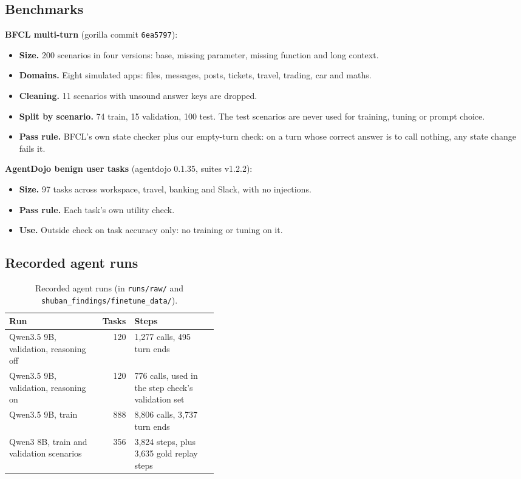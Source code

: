 \documentclass[10.5pt,a4paper]{article}
\newcommand{\tablestyle}{\small\rowcolors{2}{rowshade}{white}}
\newcommand{\code}[1]{\texttt{#1}}
\begin{document}
\subsection{Benchmarks}
\textbf{BFCL multi-turn} (gorilla commit \code{6ea5797}):
\begin{itemize}
  \item \textbf{Size.} 200 scenarios in four versions: base, missing parameter, missing function and long context.
  \item \textbf{Domains.} Eight simulated apps: files, messages, posts, tickets, travel, trading, car and maths.
  \item \textbf{Cleaning.} 11 scenarios with unsound answer keys are dropped.
  \item \textbf{Split by scenario.} 74 train, 15 validation, 100 test. The test scenarios are never used for training, tuning or prompt choice.
  \item \textbf{Pass rule.} BFCL's own state checker plus our empty-turn check: on a turn whose correct answer is to call nothing, any state change fails it.
\end{itemize}

\textbf{AgentDojo benign user tasks} (agentdojo 0.1.35, suites v1.2.2):
\begin{itemize}
  \item \textbf{Size.} 97 tasks across workspace, travel, banking and Slack, with no injections.
  \item \textbf{Pass rule.} Each task's own utility check.
  \item \textbf{Use.} Outside check on task accuracy only: no training or tuning on it.
\end{itemize}

\subsection{Recorded agent runs}
\begin{table}[H]
\centering\tablestyle
\caption{Recorded agent runs (in \code{runs/raw/} and \code{shuban\_findings/finetune\_data/}).}\label{tab:runs}
\begin{tabularx}{\linewidth}{Yrp{0.4\linewidth}}
\toprule
{}\textbf{Run} & \textbf{Tasks} & \textbf{Steps} \\
\midrule
Qwen3.5 9B, validation, reasoning off & 120 & 1,277 calls, 495 turn ends \\
Qwen3.5 9B, validation, reasoning on & 120 & 776 calls, used in the step check's validation set \\
Qwen3.5 9B, train & 888 & 8,806 calls, 3,737 turn ends \\
Qwen3 8B, train and validation scenarios & 356 & 3,824 steps, plus 3,635 gold replay steps \\
\bottomrule
\end{tabularx}
\end{table}
\end{document}
